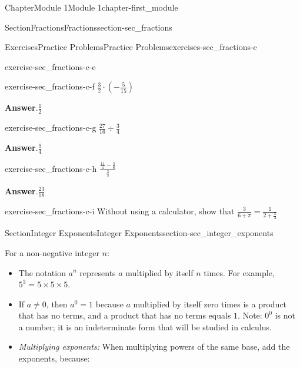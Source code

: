 \documentclass[oneside,10pt,]{book}
\newcommand{\blocktitlefont}{\relax}
\begin{document}
\begin{chapterptx}{Chapter}{Module 1}{}{Module 1}{}{}{chapter-first_module}
\begin{sectionptx}{Section}{Fractions}{}{Fractions}{}{}{section-sec_fractions}
\begin{exercises-subsection-numberless}{Exercises}{Practice Problems}{}{Practice Problems}{}{}{exercises-sec_fractions-c}
\begin{divisionexercise}{3}{}{}{exercise-sec_fractions-c-e}
\end{divisionexercise}%
\begin{divisionexercise}{4}{}{}{exercise-sec_fractions-c-f}%
\(\frac{3}{2} \cdot \left(-\frac{5}{15}\right)\)%
\par\smallskip%
\noindent\textbf{\blocktitlefont Answer}.\hypertarget{answer-sec_fractions-c-f-b}{}\quad{}\(\frac{1}{2}\)%
\end{divisionexercise}%
\begin{divisionexercise}{5}{}{}{exercise-sec_fractions-c-g}%
\(\frac{27}{16} \div \frac{3}{4}\)%
\par\smallskip%
\noindent\textbf{\blocktitlefont Answer}.\hypertarget{answer-sec_fractions-c-g-b}{}\quad{}\(\frac{9}{4}\)%
\end{divisionexercise}%
\begin{divisionexercise}{6}{}{}{exercise-sec_fractions-c-h}%
\(\displaystyle \frac{\frac{11}{4} - \frac{5}{6}}{\frac{3}{2}}\)%
\par\smallskip%
\noindent\textbf{\blocktitlefont Answer}.\hypertarget{answer-sec_fractions-c-h-b}{}\quad{}\(\frac{23}{18}\)%
\end{divisionexercise}%
\begin{divisionexercise}{7}{}{}{exercise-sec_fractions-c-i}%
Without using a calculator, show that \(\frac{3}{6+\pi}=\frac{1}{2+\frac{\pi}{3}}\)%
\end{divisionexercise}%
\end{exercises-subsection-numberless}
\end{sectionptx}
%
%
\typeout{************************************************}
\typeout{************************************************}
%
\begin{sectionptx}{Section}{Integer Exponents}{}{Integer Exponents}{}{}{section-sec_integer_exponents}
\begin{introduction}{}%
For a non-negative integer \(n\):%
%
\begin{itemize}[label=\textbullet]
\item{}The notation \(a^n\) represents \(a\) multiplied by itself \(n\) times. For example, \(5^3 = 5 \times 5 \times 5\).%
\item{}If \(a \neq 0\), then \(a^0 = 1\) because \(a\) multiplied by itself zero times is a product that has no terms, and a product that has no terms equals \(1\).  Note: \(0^0\) is not a number; it is an indeterminate form that will be studied in calculus.%
\item{} \emph{Multiplying exponents:} When multiplying powers of the same base, add the exponents, because:%

\end{itemize}
\end{introduction}
\end{sectionptx}
\end{chapterptx}
\end{document}
